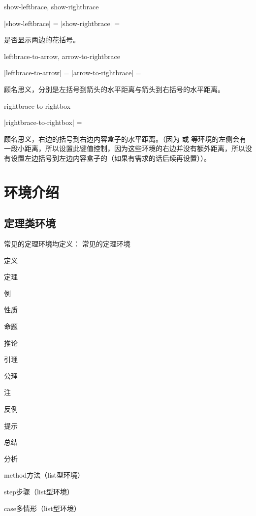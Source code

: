 \documentclass{xdyy-usermanual}
\begin{document}
\begin{function}[added = 2022-01-12]{show-leftbrace, show-rightbrace}
  \begin{syntax}
    |show-leftbrace| =  
    |show-rightbrace| =  
  \end{syntax}
  是否显示两边的花括号。
\end{function}

\begin{function}[added = 2022-01-12]{leftbrace-to-arrow, arrow-to-rightbrace}
  \begin{syntax}
    |leftbrace-to-arrow| =  \init{7pt}
    |arrow-to-rightbrace| =  \init{2pt}
  \end{syntax}
  顾名思义，分别是左括号到箭头的水平距离与箭头到右括号的水平距离。
\end{function}

\begin{function}[added = 2022-01-12]{rightbrace-to-rightbox}
  \begin{syntax}
    |rightbrace-to-rightbox| =  \init{3mm}
  \end{syntax}
  顾名思义，右边的括号到右边内容盒子的水平距离。（因为  或  等环境的左侧会有一段小距离，所以设置此键值控制，因为这些环境的右边并没有额外距离，所以没有设置左边括号到左边内容盒子的（如果有需求的话后续再设置））。
\end{function}



\section{环境介绍}


\subsection{定理类环境}

常见的定理环境均定义：
常见的定理环境
  \begin{xchoices}[label-style = arabic]
    \item 定义
    \item 定理
    \item 例
    \item 性质
    \item 命题
    \item 推论
    \item 引理
    \item 公理
    \item 注
    \item 反例
    \item 提示
    \item 总结
    \item 分析
    \item method方法（list型环境）
    \item step步骤（list型环境）
    \item case多情形（list型环境）
  \end{xchoices}
\end{document}
